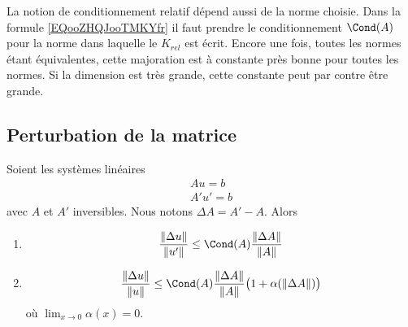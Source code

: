 \begin{remark}      \label{REMooAIKIooJEBEqi}
    La notion de conditionnement relatif dépend aussi de la norme choisie. Dans la formule \eqref{EQooZHQJooTMKYfr} il faut prendre le conditionnement \( \Cond(A)\) pour la norme dans laquelle le \( K_{rel}\) est écrit. Encore une fois, toutes les normes étant équivalentes,  cette majoration est à constante près bonne pour toutes les normes. Si la dimension est très grande, cette constante peut par contre être grande.
\end{remark}

\subsection{Perturbation de la matrice}

\begin{proposition}
    Soient les systèmes linéaires
    \begin{subequations}
        \begin{align}
            Au=b\\
            A'u'=b
        \end{align}
    \end{subequations}
    avec \( A\) et \( A'\) inversibles. Nous notons \( \Delta A=A'-A\). Alors
    \begin{enumerate}
        \item       \label{ITEMooJMTKooSEBavB}
            \begin{equation}
                \frac{ \| \Delta u \| }{ \| u' \| }\leq \Cond(A)\frac{ \| \Delta A \| }{ \| A \| }
            \end{equation}
        \item
            \begin{equation}
                \frac{ \| \Delta u \| }{ \| u \| }\leq \Cond(A)\frac{ \| \Delta A \| }{ \| A \| }\big( 1+\alpha(\| \Delta A \|) \big)
            \end{equation}
            où \( \lim_{x\to 0} \alpha(x)=0\).
    \end{enumerate}
\end{proposition}

